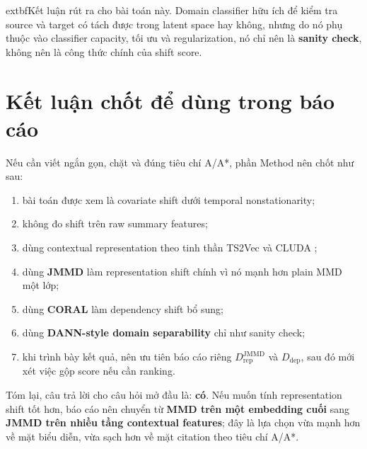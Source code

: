 \documentclass[a4paper]{article}
\begin{document}
	extbf{Kết luận rút ra cho bài toán này.} Domain classifier hữu ích để kiểm tra source và target có tách được trong latent space hay không, nhưng do nó phụ thuộc vào classifier capacity, tối ưu và regularization, nó chỉ nên là \textbf{sanity check}, không nên là công thức chính của shift score.

\section{Kết luận chốt để dùng trong báo cáo}

Nếu cần viết ngắn gọn, chặt và đúng tiêu chí A/A*, phần Method nên chốt như sau:
\begin{enumerate}[label=\arabic*.]
    \item bài toán được xem là covariate shift dưới temporal nonstationarity;
    \item không đo shift trên raw summary features;
    \item dùng contextual representation theo tinh thần TS2Vec \cite{ts2vec} và CLUDA \cite{cluda};
    \item dùng \textbf{JMMD} \cite{jan} làm representation shift chính vì nó mạnh hơn plain MMD một lớp;
    \item dùng \textbf{CORAL} \cite{coral} làm dependency shift bổ sung;
    \item dùng \textbf{DANN-style domain separability} \cite{dann} chỉ như sanity check;
    \item khi trình bày kết quả, nên ưu tiên báo cáo riêng \(D_{\mathrm{rep}}^{\mathrm{JMMD}}\) và \(D_{\mathrm{dep}}\), sau đó mới xét việc gộp score nếu cần ranking.
\end{enumerate}

Tóm lại, câu trả lời cho câu hỏi mở đầu là: \textbf{có}. Nếu muốn tính representation shift tốt hơn, báo cáo nên chuyển từ \textbf{MMD trên một embedding cuối} sang \textbf{JMMD trên nhiều tầng contextual features}; đây là lựa chọn vừa mạnh hơn về mặt biểu diễn, vừa sạch hơn về mặt citation theo tiêu chí A/A*.
\end{document}
